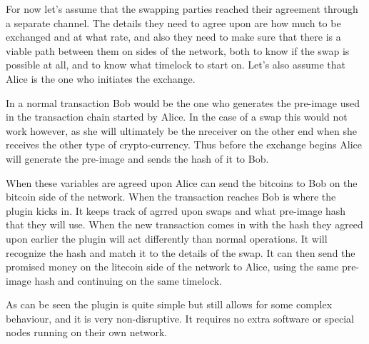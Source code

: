 For now let's assume that the swapping parties reached their agreement through 
a separate channel. The details they need to agree upon are how much to be 
exchanged and at what rate, and also they need to make sure that there is a 
viable path between them on sides of the network, both to know if the swap 
is possible at all, and to know what timelock to start on. Let's also 
assume that Alice is the one who initiates the exchange.

In a normal transaction Bob would be the one who generates the pre-image used 
in the transaction chain started by Alice. In the case of a swap this would not 
work however, as she will ultimately be the nreceiver on the other end
when she receives the other type of crypto-currency. Thus before the exchange
begins Alice will generate the pre-image and sends the hash of it to Bob.

When these variables are agreed upon Alice can send the bitcoins to Bob on the
bitcoin side of the network. When the transaction reaches Bob is where the plugin
kicks in. It keeps track of agrred upon swaps and what pre-image hash that they
will use. When the new transaction comes in with the hash they agreed upon earlier
the plugin will act differently than normal operations. It will recognize the hash
and match it to the details of the swap. It can then send the promised money on 
the litecoin side of the network to Alice, using the same pre-image hash and 
continuing on the same timelock. 

As can be seen the plugin is quite simple but still allows for some complex 
behaviour, and it is very non-disruptive. It requires no extra software or special
nodes running on their own network. 

